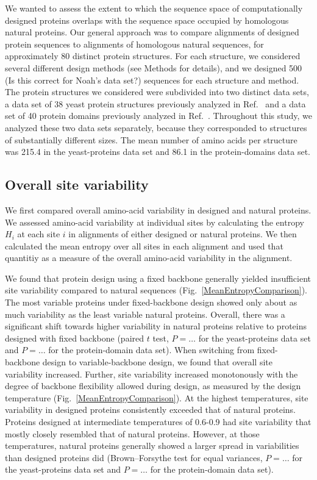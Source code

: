 \documentclass[12pt]{article}
\begin{document}
We wanted to assess the extent to which the sequence space of computationally designed proteins overlaps with the sequence space occupied by homologous natural proteins. Our general approach was to compare alignments of designed protein sequences to alignments of homologous natural sequences, for approximately 80 distinct protein structures. For each structure, we considered several different design methods (see Methods for details), and we designed 500 {\color{red}(Is this correct for Noah's data set?)} sequences for each structure and method. The protein structures we considered were subdivided into two distinct data sets, a data set of 38 yeast protein structures previously analyzed in Ref.\ \cite{Ramsey2011} and a data set of 40 protein domains previously analyzed in  Ref.\ \cite{OllikainenKortemme}. Throughout this study, we analyzed these two data sets separately, because they corresponded to structures of substantially different sizes. The mean number of amino acids per structure was 215.4 in the yeast-proteins data set and 86.1 in the protein-domains data set.

\subsection{Overall site variability}
\label{SiteVariability}

We first compared overall amino-acid variability in designed and natural proteins. We assessed amino-acid variability at individual sites by calculating the entropy $H_i$ at each site $i$ in alignments of either designed or natural proteins. We then calculated the mean entropy over all sites in each alignment and used that quantitiy as a measure of the overall amino-acid variability in the alignment.

We found that protein design using a fixed backbone generally yielded insufficient site variability compared to natural sequences (Fig.~\ref{MeanEntropyComparison}). The most variable proteins under fixed-backbone design showed only about as much variability as the least variable natural proteins. Overall, there was a significant shift towards higher variability in natural proteins relative to proteins designed with fixed backbone (paired $t$ test, {\color{red}$P=\dots$} for the yeast-proteins data set and {\color{red}$P=\dots$} for the protein-domain data set). When switching from fixed-backbone design to variable-backbone design, we found that overall site variability increased. Further, site variability increased monotonously with the degree of backbone flexibility allowed during design, as measured by the design temperature (Fig.~\ref{MeanEntropyComparison}). At the highest temperatures, site variability in designed proteins consistently exceeded that of natural proteins. Proteins designed at intermediate temperatures of 0.6-0.9 had site variability that mostly closely resembled that of natural proteins. However, at those temperatures, natural proteins generally showed a larger spread in variabilities than designed proteins did (Brown–Forsythe test for equal variances, {\color{red}$P=\dots$} for the yeast-proteins data set and {\color{red}$P=\dots$} for the protein-domain data set).
\end{document}

